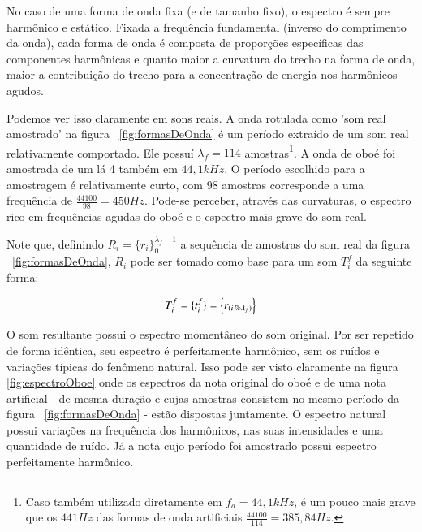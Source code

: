 No caso de uma forma de onda fixa (e de tamanho fixo), o espectro é sempre harmônico e estático. Fixada a frequência fundamental (inverso do comprimento da onda), cada forma de onda é composta de proporções específicas das componentes harmônicas e 
quanto maior a curvatura do trecho na forma de onda, maior a contribuição do trecho para a
concentração de energia nos harmônicos agudos.

Podemos ver isso claramente em sons reais. A onda rotulada como 'som real amostrado' na figura ~\ref{fig:formasDeOnda} é um período extraído de um som real relativamente comportado. Ele possuí $\lambda_f=114$ amostras\footnote{Caso também utilizado diretamente em $f_a=44,1kHz$, é um pouco mais grave que os $441 Hz$ das formas de onda artificiais $\frac{44100}{114}=385,84Hz$.}. A onda de oboé foi amostrada de um lá 4 também em $44,1kHz$.
O período escolhido para a amostragem é relativamente curto, com 98 amostras corresponde a 
uma frequência de $\frac{44100}{98}=450 Hz$. Pode-se perceber, através das curvaturas, o espectro rico em 
frequências agudas do oboé e o espectro mais grave do som real.

Note que, definindo $ R_i=\{ r_i \}_0^{\lambda_f-1}$ a sequência de amostras do som real da figura ~\ref{fig:formasDeOnda},
$R_i$ pode ser tomado como base para um som $T_i^f$ da seguinte forma: 

\begin{equation}\label{sampleandoFormaDeOnda}
     T^f_i=\{ t_i^f \}=\Bigl\{ r_{(i\,\%\lambda_{f})} \Bigr\}
\end{equation}

O som resultante possui o espectro momentâneo do som original. Por ser repetido de forma idêntica,
seu espectro é perfeitamente harmônico, sem os ruídos e variações típicas do fenômeno natural. Isso pode ser 
visto claramente na figura \ref{fig:espectroOboe} onde os espectros da nota original do oboé e de uma nota 
artificial - de mesma duração e cujas amostras consistem no mesmo período da figura ~\ref{fig:formasDeOnda} - estão dispostas juntamente. O espectro natural possui variações na frequência dos harmônicos, nas suas intensidades e uma quantidade de ruído. Já a nota cujo período foi amostrado possui espectro perfeitamente harmônico.



